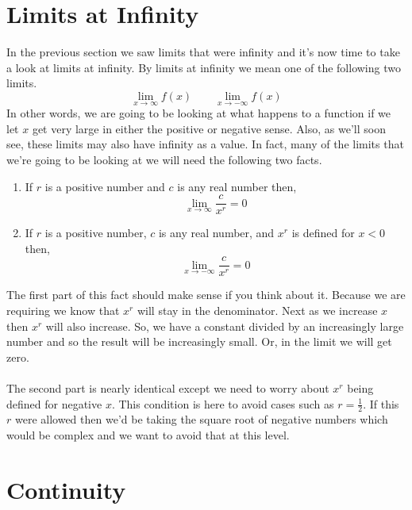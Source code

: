 \documentclass[10pt,reqno]{book}
\begin{document}
	
	\section{Limits at Infinity}
	
	In the previous section we saw limits that were infinity and it’s now time to take a look at limits at infinity.  By limits at infinity we mean one of the following two limits.
	\[ \lim\limits_{x\to \infty} f(x) \qquad \lim\limits_{x\to -\infty} f(x) \]
	In other words, we are going to be looking at what happens to a function if we let $ x $ get very large in either the positive or negative sense. Also, as we'll soon see, these limits may also have infinity as a value. In fact, many of the limits that we’re going to be looking at we will need the following two facts.
	\begin{enumerate}
		\item If $ r $ is a positive number and $ c $ is any real number then,
			\[ \lim\limits_{x\to \infty} \frac{c}{x^r} = 0 \]
		\item If $ r $ is a positive number, $ c $ is any real number, and $ x^r $ is defined for $ x<0 $ then,
			\[ \lim\limits_{x\to -\infty} \frac{c}{x^r} = 0 \]
	\end{enumerate}
	The first part of this fact should make sense if you think about it. Because we are requiring  we know that $ x^r $ will stay in the denominator. Next as we increase $ x $ then $ x^r $ will also increase. So, we have a constant divided by an increasingly large number and so the result will be increasingly small. Or, in the limit we will get zero.\\ \\
	The second part is nearly identical except we need to worry about $ x^r $ being defined for negative $ x $. This condition is here to avoid cases such as $ r = \frac{1}{2} $. If this $ r $ were allowed then we'd be taking the square root of negative numbers which would be complex and we want to avoid that at this level.
	
	\section{Continuity}
	
	
	
	
	
	
	
	
	
	
	
	
	
	
	
	
	
	
	
	
	
	
	
	
	
	
	
	\pagestyle{plain}
	
\end{document}
